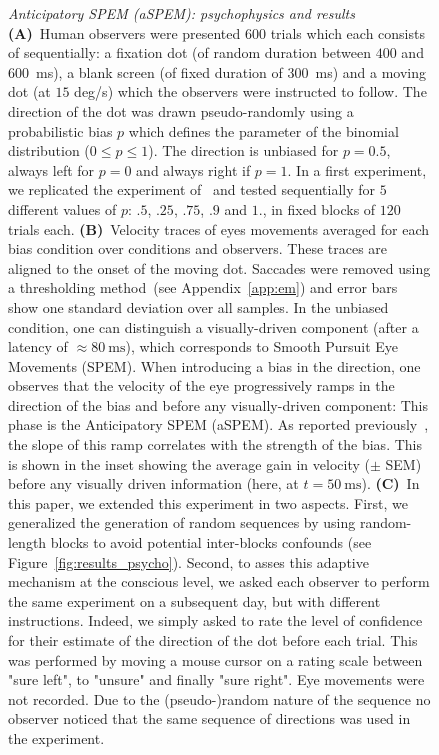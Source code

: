 \documentclass[profile,final,english,draft]{article}%
\newcommand{\ms}{\si{\milli\second}}%
\newcommand{\citep}[1]{\parencite{#1}}
\newcommand{\seeFig}[1]{Figure~\ref{fig:#1}}
\newcommand{\seeApp}[1]{Appendix~\ref{app:#1}}
\begin{document}
\begin{figure}
{}
\caption{\emph{Anticipatory SPEM (aSPEM): psychophysics and results} %
\textbf{(A)}~Human observers were presented $600$ trials %
which each consists of sequentially:
a fixation dot (of random duration between $400$ and $600$~\ms),
a blank screen (of fixed duration of  $300$~\ms) and
a moving dot (at $15$ deg/s) which the observers were instructed to follow.
The direction of the dot was drawn pseudo-randomly
using a probabilistic bias $p$ which defines the parameter
of the binomial distribution
($0\leq p\leq 1 $). The direction is unbiased for $p=0.5$,
always left for $p=0$ and always right if $p=1$.
In a first experiment,
we replicated the experiment of~\citep{Montagnini2010} and
tested sequentially for $5$ different values of $p$:
$.5$, $.25$, $.75$, $.9$ and $1.$,
in fixed blocks of $120$ trials each.
\textbf{(B)}~Velocity traces of eyes movements
averaged for each bias condition
over conditions and observers.
These traces are aligned to the onset of the moving dot.
Saccades were removed using a thresholding method~(see \seeApp{em}) and
error bars show one standard deviation over all samples.
In the unbiased condition, one can distinguish
a visually-driven component (after a latency of $\approx 80~\ms$),
which corresponds to Smooth Pursuit Eye Movements (SPEM).
When introducing a bias in the direction,
one observes that the velocity of the eye progressively ramps
in the direction of the bias and before any visually-driven component:
This phase is the Anticipatory SPEM (aSPEM).
As reported previously~\citep{Montagnini2010, SantosKowler2017},
the slope of this ramp correlates with the strength of the bias.
This is shown in the inset showing the average gain in velocity ($\pm$ SEM)
before any visually driven information (here, at $t=50~\ms$).
\textbf{(C)}~In this paper, we extended this experiment in two aspects.
First, we generalized the generation of random sequences
by using random-length blocks
to avoid potential inter-blocks confounds (see \seeFig{results_psycho}).
Second, to asses this adaptive mechanism at the conscious level,
we asked each observer to perform the same experiment on a subsequent day,
but with different instructions.
Indeed, we simply asked to rate the level of confidence
for their estimate of the direction of the dot before each trial.
This was performed by moving a mouse cursor on a rating scale
between "sure left", to "unsure" and finally "sure right".
Eye movements were not recorded.
Due to the (pseudo-)random nature of the sequence no observer noticed
that the same sequence of directions was used in the experiment.
}
\label{fig:intro}
\end{figure}
\end{document}
